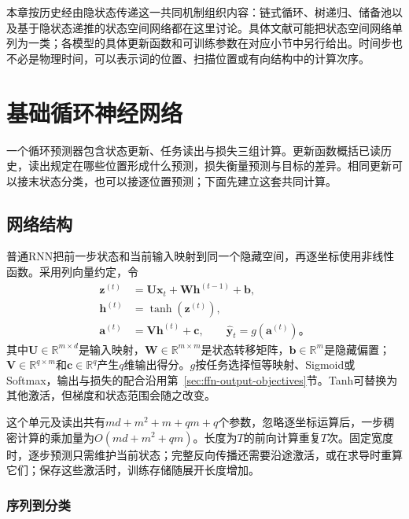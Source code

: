 本章按历史经由隐状态传递这一共同机制组织内容：链式循环、树递归、储备池以及基于隐状态递推的状态空间网络都在这里讨论。具体文献可能把状态空间网络单列为一类；各模型的具体更新函数和可训练参数在对应小节中另行给出。时间步也不必是物理时间，可以表示词的位置、扫描位置或有向结构中的计算次序。

\section{基础循环神经网络}
\label{sec:rnn-basic}

一个循环预测器包含状态更新、任务读出与损失三组计算。更新函数概括已读历史，读出规定在哪些位置形成什么预测，损失衡量预测与目标的差异。相同更新可以接末状态分类，也可以接逐位置预测；下面先建立这套共同计算。

\subsection{网络结构}
\label{sec:rnn-structure}

普通RNN把前一步状态和当前输入映射到同一个隐藏空间，再逐坐标使用非线性函数。采用列向量约定，令
\begin{equation}
  \begin{aligned}
    \bm{z}^{(t)}&=\bm{U}\bm{x}_t+\bm{W}\bm{h}^{(t-1)}+\bm{b},\\
    \bm{h}^{(t)}&=\tanh\!\left(\bm{z}^{(t)}\right),\\
    \bm{a}^{(t)}&=\bm{V}\bm{h}^{(t)}+\bm{c},\qquad
    \widehat{\bm{y}}_t=g\!\left(\bm{a}^{(t)}\right)\text{。}
  \end{aligned}
  \label{eq:rnn-basic-cell}
\end{equation}
其中$\bm{U}\in\mathbb{R}^{m\times d}$是输入映射，$\bm{W}\in\mathbb{R}^{m\times m}$是状态转移矩阵，$\bm{b}\in\mathbb{R}^{m}$是隐藏偏置；$\bm{V}\in\mathbb{R}^{q\times m}$和$\bm{c}\in\mathbb{R}^{q}$产生$q$维输出得分。$g$按任务选择恒等映射、Sigmoid或Softmax，输出与损失的配合沿用第~\ref{sec:ffn-output-objectives}节。Tanh可替换为其他激活，但梯度和状态范围会随之改变。

这个单元及读出共有$md+m^2+m+qm+q$个参数，忽略逐坐标运算后，一步稠密计算的乘加量为$O(md+m^2+qm)$。长度为$T$的前向计算重复$T$次。固定宽度时，逐步预测只需维护当前状态；完整反向传播还需要沿途激活，或在求导时重算它们；保存这些激活时，训练存储随展开长度增加。

\subsubsection{序列到分类}
\label{sec:rnn-sequence-classification}

